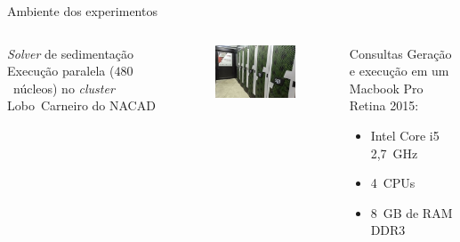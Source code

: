 \documentclass[12pt]{beamer}
\begin{document}
\begin{frame}{Ambiente dos experimentos}

\begin{columns}[t]


\vspace{-.7cm}

\begin{block}{\textit{Solver} de sedimentação}
Execução paralela ($480$~núcleos) no \textit{cluster} Lobo~Carneiro do NACAD\footnotemark{}
\end{block}

\begin{figure}
\includegraphics[width=\textwidth]{img/loboc.jpg}
\end{figure}

\pause


\vspace{-.7cm}

\begin{block}{Consultas}
Geração e execução em um Macbook Pro Retina 2015:

\begin{itemize}
\item Intel Core i5 2,7~GHz
\item 4~CPUs
\item 8~GB de RAM DDR3
\end{itemize}
\end{block}


\end{columns}
\end{frame}
\end{document}
